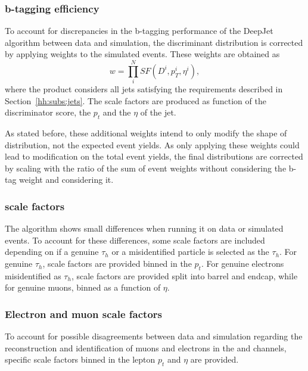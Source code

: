 \documentclass[../main.tex]{subfiles}
\begin{document}
\subsubsection*{b-tagging efficiency}

To account for discrepancies in the b-tagging performance of the DeepJet algorithm between data and simulation, the discriminant distribution is corrected by applying weights to the simulated events. These weights are obtained as
\begin{equation}
w = \prod_i^{N} SF(D^i, p_T^i, \eta^i),
\end{equation}
where the product considers all jets satisfying the requirements described in Section~\ref{hh:subs:jets}. The scale factors are produced as function of the discriminator score, the $p_t$ and the $\eta$ of the jet.

As stated before, these additional weights intend to only modify the shape of distribution, not the expected event yields. As only applying these weights could lead to modification on the total event yields, the final distributions are corrected by scaling with the ratio of the sum of event weights without considering the b-tag weight and considering it.

\subsubsection*{\deeptau{} scale factors}

The \deeptau{} algorithm shows small differences when running it on data or simulated events. To account for these differences, some scale factors are included depending on if a genuine $\tau_h$ or a misidentified particle is selected as the $\tau_h$. For genuine $\tau_h$, scale factors are provided binned in the \tauh{} $p_t$. For genuine electrons misidentified as $\tau_h$, scale factors are provided split into barrel and endcap, while for genuine muons, binned as a function of $\eta$.

\subsubsection*{Electron and muon scale factors}

To account for possible disagreements between data and simulation regarding the reconstruction and identification of muons and electrons in the \taumu\tauh{} and \taue\tauh{} channels, specific scale factors binned in the lepton $p_t$ and $\eta$ are provided.
\end{document}

